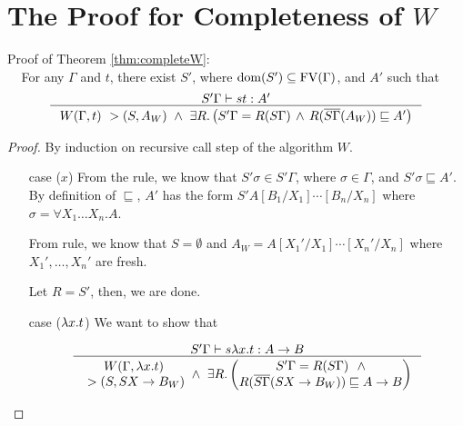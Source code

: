 \chapter{The Proof for Completeness of $W$}
\label{app:completeWproof}
Proof of Theorem \ref{thm:completeW}:
~\\ $~$ $~$ For any $\Gamma$ and $t$,
there exist $S'$, where $\mathop{\mathrm{dom}}(S')\subseteq\mathop{\mathrm{FV}}(\Gamma)$, and $A'$ such that
\[ \inference{ S'\Gamma |-s t : A' }{
        W(\Gamma,t) ~> (S,A_W) ~\land~
        \exists R . \left(
                S'\Gamma = R(S\Gamma) \,\land\,
                R(\overline{S\Gamma}(A_W))\sqsubseteq A' \right) }
\]
\begin{proof}
By induction on recursive call step of the algorithm $W$.
\begin{itemize}
\item[case]($x$)
        From the  rule, we know that
        $S'\sigma \in S'\Gamma$, where $\sigma\in\Gamma$,
        and $S'\sigma\sqsubseteq A'$.
        By definition of $\sqsubseteq$, $A'$ has the form
        $S'A[B_1/X_1]\cdots[B_n/X_n]$ where $\sigma = \forall X_1\dots X_n.A$.

        From  rule, we know that
        $S = \emptyset $ and $A_W = A[X_1'/X_1]\cdots[X_n'/X_n]$
        where $X_1',\dots,X_n'$ are fresh.

        Let $R=S'$, then, we are done.

\item[case]($\lambda x.t$)
        We want to show that \vspace*{-2em}
        \begin{singlespace}
        \[\inference{S'\Gamma |-s \l x.t : A -> B}{
        \begin{matrix} W(\Gamma,\l x.t) \\ ~> (S,S X -> B_W) \end{matrix}
        ~\land~
        \exists R.
                \left(\begin{matrix}
                        S'\Gamma=R(S\Gamma) ~~ \land \\
                        R(\overline{S\Gamma}(SX -> B_W))\sqsubseteq A -> B
                \end{matrix}\right) } \]
        \end{singlespace}


\end{itemize}
\end{proof}
